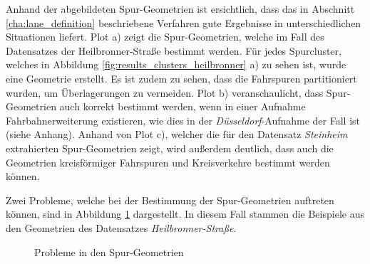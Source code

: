 Anhand der abgebildeten Spur-Geometrien ist ersichtlich, dass das in Abschnitt \ref{cha:lane_definition}
beschriebene Verfahren gute Ergebnisse in unterschiedlichen Situationen liefert.
Plot a) zeigt die Spur-Geometrien, welche im Fall des Datensatzes der Heilbronner-Straße bestimmt werden.
Für jedes Spurcluster, welches in Abbildung \ref{fig:results_clusters_heilbronner} a) zu sehen ist, wurde eine Geometrie erstellt.
Es ist zudem zu sehen, dass die Fahrspuren partitioniert wurden, um Überlagerungen zu vermeiden.
Plot b) veranschaulicht, dass Spur-Geometrien auch korrekt bestimmt werden, wenn in einer Aufnahme
Fahrbahnerweiterung existieren, wie dies in der \textit{Düsseldorf}-Aufnahme der Fall ist (siehe Anhang).
Anhand von Plot c), welcher die für den Datensatz \textit{Steinheim} extrahierten Spur-Geometrien zeigt, wird
außerdem deutlich, dass auch die Geometrien kreisförmiger Fahrspuren und Kreisverkehre bestimmt werden können.

Zwei Probleme, welche bei der Bestimmung der Spur-Geometrien auftreten können, sind in Abbildung
\ref{fig:results_defekts_laneGeos} dargestellt. In diesem Fall stammen die Beispiele aus den Geometrien
des Datensatzes \textit{Heilbronner-Straße}.

\begin{figure}[H]
    \centering
    \qquad \qquad
    \caption[Probleme in den Spur-Geometrien]{Probleme in den Spur-Geometrien}
    \label{fig:results_defekts_laneGeos}
\end{figure}

